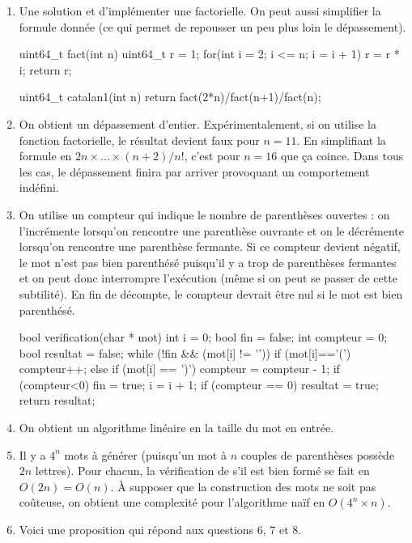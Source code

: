 \documentclass{ccinp}
\begin{document}
\begin{enumerate}
\item Une solution et d'implémenter une factorielle. On peut aussi simplifier la formule donnée (ce qui permet de repousser un peu plus loin le dépassement).
\begin{ccode}
uint64_t fact(int n) {
    uint64_t r = 1;
    for(int i = 2; i <= n; i = i + 1){
        r = r * i;
    }
    return r;
}

uint64_t catalan1(int n) {
    return fact(2*n)/fact(n+1)/fact(n);
}\end{ccode}
  \item On obtient un dépassement d'entier.
        Expérimentalement, si on utilise la fonction factorielle, le résultat devient faux pour $n=11$.
        En simplifiant la formule en $2n \times ... \times (n+2)/n!$, c'est pour $n=16$ que ça coince.
        Dans tous les cas, le dépassement finira par arriver provoquant un comportement indéfini.
\item On utilise un compteur qui indique le nombre de parenthèses ouvertes : on l'incrémente lorsqu'on rencontre une parenthèse ouvrante et on le décrémente lorsqu'on rencontre une parenthèse fermante. Si ce compteur devient négatif, le mot n'est pas bien parenthésé puisqu'il y a trop de parenthèses fermantes et on peut donc interrompre l'exécution (même si on peut se passer de cette subtilité). En fin de décompte, le compteur devrait être nul si le mot est bien parenthésé.
\begin{ccode}
bool verification(char * mot) {
    int i = 0;
    bool fin = false;
    int compteur = 0;
    bool resultat = false;
    while (!fin && (mot[i] != '\0')) {
        if (mot[i]=='(') {
            compteur++;
        }
        else if (mot[i] == ')') {
            compteur = compteur - 1;
        }
        if (compteur<0) {
            fin = true;
        }
        i = i + 1;
    }
    if (compteur == 0) {
        resultat = true;
    }
    return resultat;
}
\end{ccode}
\item On obtient un algorithme linéaire en la taille du mot en entrée.
\item Il y a $4^n$ mots à générer (puisqu'un mot à $n$ couples de parenthèses possède $2n$ lettres). Pour chacun, la vérification de s'il est bien formé se fait en $O(2n) = O(n)$. \`A supposer que la construction des mots ne soit pas coûteuse, on obtient une complexité pour l'algorithme naïf en $O(4^n \times n)$.
\item Voici une proposition qui répond aux questions 6, 7 et 8.


\end{enumerate}
\end{document}
